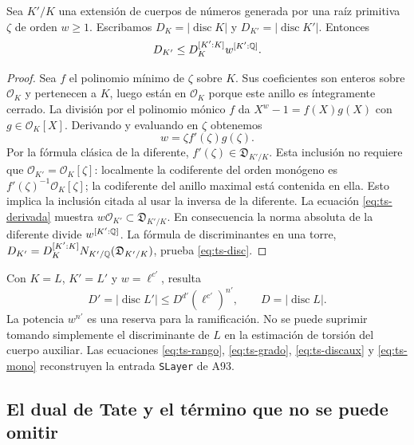 \begin{lema}
\label{lem:ts-discriminante}
Sea $K'/K$ una extensión de cuerpos de números generada por una raíz primitiva $\zeta$ de orden $w\ge1$. Escribamos $D_K=|\operatorname{disc}K|$ y $D_{K'}=|\operatorname{disc}K'|$. Entonces
\begin{equation}
 D_{K'}\le D_K^{[K':K]}w^{[K':\mathbb{Q}]}.
 \label{eq:ts-disc}
\end{equation}
\end{lema}
\begin{proof}
Sea $f$ el polinomio mínimo de $\zeta$ sobre $K$. Sus coeficientes son enteros sobre $\mathcal O_K$ y pertenecen a $K$, luego están en $\mathcal O_K$ porque este anillo es íntegramente cerrado. La división por el polinomio mónico $f$ da $X^w-1=f(X)g(X)$ con $g\in\mathcal O_K[X]$. Derivando y evaluando en $\zeta$ obtenemos
\begin{equation}
 w=\zeta f'(\zeta)g(\zeta).
 \label{eq:ts-derivada}
\end{equation}
Por la fórmula clásica de la diferente, $f'(\zeta)\in\mathfrak D_{K'/K}$. Esta inclusión no requiere que $\mathcal O_{K'}=\mathcal O_K[\zeta]$: localmente la codiferente del orden monógeno es $f'(\zeta)^{-1}\mathcal O_K[\zeta]$; la codiferente del anillo maximal está contenida en ella. Esto implica la inclusión citada al usar la inversa de la diferente. La ecuación \eqref{eq:ts-derivada} muestra $w\mathcal O_{K'}\subset\mathfrak D_{K'/K}$. En consecuencia la norma absoluta de la diferente divide $w^{[K':\mathbb{Q}]}$. La fórmula de discriminantes en una torre, $D_{K'}=D_K^{[K':K]}N_{K'/\mathbb{Q}}(\mathfrak D_{K'/K})$, prueba \eqref{eq:ts-disc}.
\end{proof}

Con $K=L$, $K'=L'$ y $w=\ell^{c'}$, resulta
\begin{equation}
 D'=|\operatorname{disc}L'|\le D^{d'}(\ell^{c'})^{n'},\qquad D=|\operatorname{disc}L|.
 \label{eq:ts-discaux}
\end{equation}
La potencia $w^{n'}$ es una reserva para la ramificación. No se puede suprimir tomando simplemente el discriminante de $L$ en la estimación de torsión del cuerpo auxiliar. Las ecuaciones \eqref{eq:ts-rango}, \eqref{eq:ts-grado}, \eqref{eq:ts-discaux} y \eqref{eq:ts-mono} reconstruyen la entrada \texttt{SLayer} de A93.

\subsection{El dual de Tate y el término que no se puede omitir}

